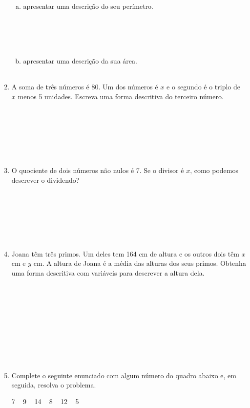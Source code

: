 \documentclass[a4paper,14pt]{article}
\begin{document}
\begin{multicols}{2}
\begin{enumerate}
    		\begin{enumerate}[a)]
    			\item apresentar uma descrição do seu perímetro. \\\\\\\\\\
    			\item apresentar uma descrição da sua área. \\\\
    		\end{enumerate}
    		\item A soma de três números é 80. Um dos números é $x$ e o segundo é o triplo de $x$ menos 5 unidades. Escreva uma forma descritiva do terceiro número. \\\\\\\\\\\\\\
    		\item O quociente de dois números não nulos é 7. Se o divisor é $x$, como podemos descrever o dividendo? \\\\\\\\\\\\\\
    		\item Joana têm três primos. Um deles tem 164 cm de altura e os outros dois têm $x$ cm e $y$ cm. A altura de Joana é a média das alturas dos seus primos. Obtenha uma forma descritiva com variáveis para descrever a altura dela. \\\\\\\\\\\\\\\\\\\\
    		\item Complete o seguinte enunciado com algum número do quadro abaixo e, em seguida, resolva o problema.
    		\noindent
    		\begin{center} \begin{tcolorbox}[colback=white, colframe=black, boxrule=0.5mm, width=6cm]
    			7 ~ 9 ~ 14 ~ 8 ~ 12 ~ 5

\end{tcolorbox}
\end{center}
\end{enumerate}
\end{multicols}
\end{document}
